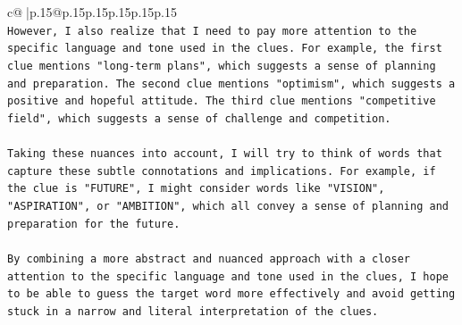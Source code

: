 \documentclass{article}
\begin{document}
{\begin{supertabular}{c@{$\;$}|p{.15\linewidth}@{}p{.15\linewidth}p{.15\linewidth}p{.15\linewidth}p{.15\linewidth}p{.15\linewidth}}
{{{\\ 
\texttt{However, I also realize that I need to pay more attention to the specific language and tone used in the clues. For example, the first clue mentions "long{-}term plans", which suggests a sense of planning and preparation. The second clue mentions "optimism", which suggests a positive and hopeful attitude. The third clue mentions "competitive field", which suggests a sense of challenge and competition.} \\
\\ 
\texttt{Taking these nuances into account, I will try to think of words that capture these subtle connotations and implications. For example, if the clue is "FUTURE", I might consider words like "VISION", "ASPIRATION", or "AMBITION", which all convey a sense of planning and preparation for the future.} \\
\\ 
\texttt{By combining a more abstract and nuanced approach with a closer attention to the specific language and tone used in the clues, I hope to be able to guess the target word more effectively and avoid getting stuck in a narrow and literal interpretation of the clues.} \\
            }
        }
    }
     \\ \\

\end{supertabular}
}
\end{document}

